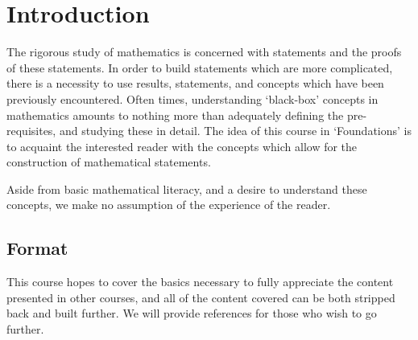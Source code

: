 \chapter{Introduction}

The rigorous study of mathematics is concerned with statements and the proofs of these statements. In order to build statements which are more complicated, there is a necessity to use results, statements, and concepts which have been previously encountered. Often times, understanding `black-box' concepts in mathematics amounts to nothing more than adequately defining the pre-requisites, and studying these in detail. The idea of this course in `Foundations' is to acquaint the interested reader with the concepts which allow for the construction of mathematical statements.

Aside from basic mathematical literacy, and a desire to understand these concepts, we make no assumption of the experience of the reader.

\section{Format}

This course hopes to cover the basics necessary to fully appreciate the content presented in other courses, and all of the content covered can be both stripped back and built further. We will provide references for those who wish to go further.

